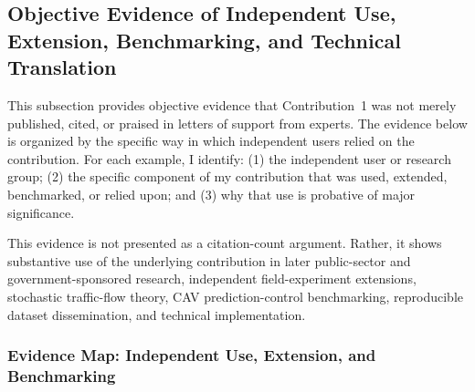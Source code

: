 \documentclass[11pt,letterpaper]{article}
\begin{document}
\subsection{Objective Evidence of Independent Use, Extension, Benchmarking, and Technical Translation}

This subsection provides objective evidence that Contribution~1 was not merely published, cited, or praised in letters of support from experts. The evidence below is organized by the specific way in which independent users relied on the contribution. For each example, I identify: (1) the independent user or research group; (2) the specific component of my contribution that was used, extended, benchmarked, or relied upon; and (3) why that use is probative of major significance.

This evidence is not presented as a citation-count argument. Rather, it shows substantive use of the underlying contribution in later public-sector and government-sponsored research, independent field-experiment extensions, stochastic traffic-flow theory, CAV prediction-control benchmarking, reproducible dataset dissemination, and technical implementation.

\subsubsection{Evidence Map: Independent Use, Extension, and Benchmarking}
\end{document}

